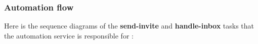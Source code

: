 \subsubsection{Automation flow}
Here is the sequence diagrams of the \textbf{send-invite} and \textbf{handle-inbox} tasks that the automation service is responsible for :
\linebreak
{}
\newpage
{}
\newpage
